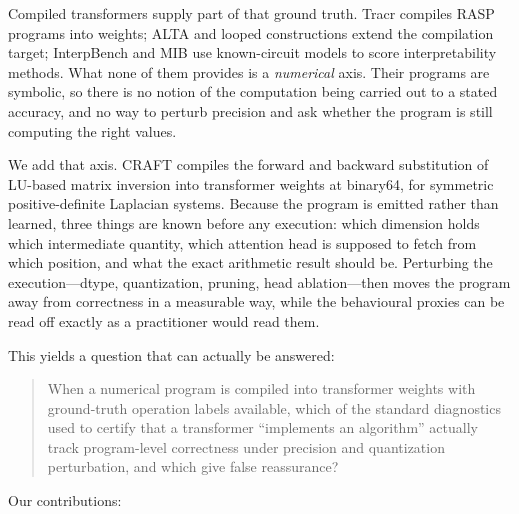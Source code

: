 \documentclass{article}
\theoremstyle{definition}
\begin{document}
Compiled transformers supply part of that ground truth. Tracr
\citep{lindner2023tracr} compiles RASP programs \citep{weiss2021thinking} into
weights; ALTA \citep{shaw2025alta} and looped constructions
\citep{giannou2023looped} extend the compilation target; InterpBench
\citep{gupta2024interpbench} and MIB \citep{mueller2025mib} use known-circuit
models to score interpretability methods. What none of them provides is a
\emph{numerical} axis. Their programs are symbolic, so there is no notion of the
computation being carried out to a stated accuracy, and no way to perturb
precision and ask whether the program is still computing the right values.

We add that axis. CRAFT compiles the forward and backward substitution of
LU-based matrix inversion into transformer weights at binary64, for symmetric
positive-definite Laplacian systems. Because the program is emitted rather than
learned, three things are known before any execution: which dimension holds which
intermediate quantity, which attention head is supposed to fetch from which
position, and what the exact arithmetic result should be. Perturbing the
execution---dtype, quantization, pruning, head ablation---then moves the program
away from correctness in a measurable way, while the behavioural proxies can be
read off exactly as a practitioner would read them.

This yields a question that can actually be answered:

\begin{quote}
When a numerical program is compiled into transformer weights with ground-truth
operation labels available, which of the standard diagnostics used to certify
that a transformer ``implements an algorithm'' actually track program-level
correctness under precision and quantization perturbation, and which give false
reassurance?
\end{quote}

Our contributions:
\end{document}
